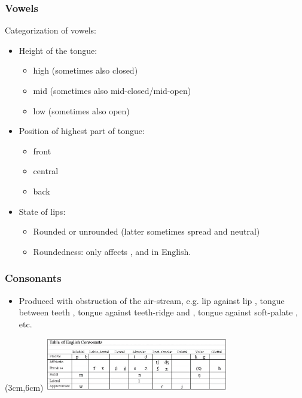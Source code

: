 \documentclass[12pt, table]{beamer}
\begin{document}
\begin{frame}
\frametitle{Vowels}
Categorization of vowels:
\begin{itemize}
\item Height of the tongue:
\begin{itemize}
\item high (sometimes also closed)
\item mid (sometimes also mid-closed/mid-open)
\item low (sometimes also open)
\end{itemize}
\item Position of highest part of tongue:
\begin{itemize}
\item front
\item central
\item back
\end{itemize}
\item State of lips:
\begin{itemize}
\item Rounded or unrounded (latter sometimes spread and neutral)
\item Roundedness: only affects , and  in English.
\end{itemize}
\end{itemize}
\end{frame}

\begin{frame}
\end{frame}

\begin{frame}
\frametitle{Consonants}
\begin{itemize}
\item Produced with obstruction of the air-stream, e.g. lip against lip \textipa{[m]}, tongue between teeth \textipa{[D]}, tongue against teeth-ridge \textipa{[t]} and \textipa{[d]}, tongue against soft-palate \textipa{[g]}, etc.
\end{itemize}
\begin{textblock*}{3cm}(3cm,6cm)
\includegraphics[width=8cm]{images/consonantchart.png}
\end{textblock*}
\end{frame}
\end{document}
